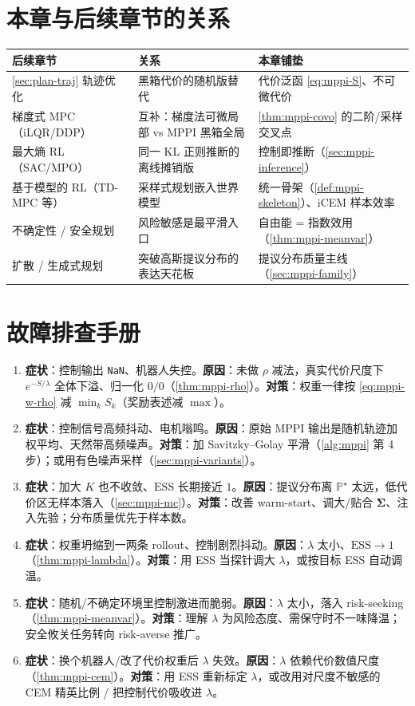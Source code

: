 \section*{本章与后续章节的关系}
\begin{table}[H]\centering\small
\begin{tabular}{lll}
\toprule
后续章节 & 关系 & 本章铺垫 \\
\midrule
\cref{sec:plan-traj} 轨迹优化 & 黑箱代价的随机版替代 & 代价泛函 \cref{eq:mppi-S}、不可微代价 \\
梯度式 MPC（iLQR/DDP） & 互补：梯度法可微局部 vs MPPI 黑箱全局 & \cref{thm:mppi-covo} 的二阶/采样交叉点 \\
最大熵 RL（SAC/MPO） & 同一 KL 正则推断的离线摊销版 & 控制即推断（\cref{sec:mppi-inference}）\\
基于模型的 RL（TD-MPC 等） & 采样式规划嵌入世界模型 & 统一骨架（\cref{def:mppi-skeleton}）、iCEM 样本效率 \\
不确定性 / 安全规划 & 风险敏感是最平滑入口 & 自由能 = 指数效用（\cref{thm:mppi-meanvar}）\\
扩散 / 生成式规划 & 突破高斯提议分布的表达天花板 & 提议分布质量主线（\cref{sec:mppi-family}）\\
\bottomrule
\end{tabular}
\end{table}

\section*{故障排查手册}
\begin{enumerate}
  \item \textbf{症状}：控制输出 \texttt{NaN}、机器人失控。\textbf{原因}：未做 $\rho$ 减法，真实代价尺度下 $e^{-S/\lambda}$ 全体下溢、归一化 $0/0$（\cref{thm:mppi-rho}）。\textbf{对策}：权重一律按 \cref{eq:mppi-w-rho} 减 $\min_k S_k$（奖励表述减 $\max$）。
  \item \textbf{症状}：控制信号高频抖动、电机嗡鸣。\textbf{原因}：原始 MPPI 输出是随机轨迹加权平均、天然带高频噪声。\textbf{对策}：加 Savitzky--Golay 平滑（\cref{alg:mppi} 第 4 步）；或用有色噪声采样（\cref{sec:mppi-variants}）。
  \item \textbf{症状}：加大 $K$ 也不收敛、$\mathrm{ESS}$ 长期接近 $1$。\textbf{原因}：提议分布离 $\mathbb{P}^\star$ 太远，低代价区无样本落入（\cref{sec:mppi-mc}）。\textbf{对策}：改善 warm-start、调大/贴合 $\boldsymbol{\Sigma}$、注入先验；分布质量优先于样本数。
  \item \textbf{症状}：权重坍缩到一两条 rollout、控制剧烈抖动。\textbf{原因}：$\lambda$ 太小、$\mathrm{ESS}\to1$（\cref{thm:mppi-lambda}）。\textbf{对策}：用 ESS 当探针调大 $\lambda$，或按目标 ESS 自动调温。
  \item \textbf{症状}：随机/不确定环境里控制激进而脆弱。\textbf{原因}：$\lambda$ 太小，落入 risk-seeking（\cref{thm:mppi-meanvar}）。\textbf{对策}：理解 $\lambda$ 为风险态度、需保守时不一味降温；安全攸关任务转向 risk-averse 推广。
  \item \textbf{症状}：换个机器人/改了代价权重后 $\lambda$ 失效。\textbf{原因}：$\lambda$ 依赖代价数值尺度（\cref{thm:mppi-cem}）。\textbf{对策}：用 ESS 重新标定 $\lambda$，或改用对尺度不敏感的 CEM 精英比例 / 把控制代价吸收进 $\lambda$。
\end{enumerate}
